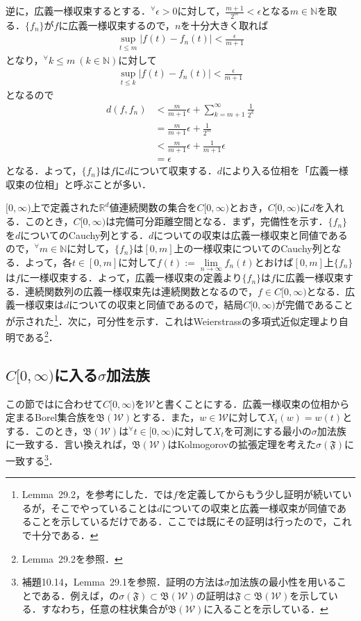 \documentclass[dvipdfmx]{jsarticle}
\begin{document}
逆に，広義一様収束するとする．$^\forall \epsilon>0$に対して，$\frac{m+1}{2^m}<\epsilon$となる$m\in\mathbb{N}$を取る．$\{f_n\}$が$f$に広義一様収束するので，$n$を十分大きく取れば
\begin{align*}
\sup_{t\leq m}|f(t)-f_n(t)|<\frac{\epsilon}{m+1}
\end{align*}
となり，$^\forall k\leq m{\ }(k\in\mathbb{N})$に対して
\begin{align*}
\sup_{t\leq k}|f(t)-f_n(t)|<\frac{\epsilon}{m+1}
\end{align*}
となるので
\begin{align*}
d(f,f_n)
&<\frac{m}{m+1}\epsilon+\sum_{k=m+1}^\infty \frac{1}{2^k} \\
&=\frac{m}{m+1}\epsilon+\frac{1}{2^m} \\
&<\frac{m}{m+1}\epsilon+\frac{1}{m+1}\epsilon \\
&=\epsilon
\end{align*}
となる．よって，$\{f_n\}$は$f$に$d$について収束する．$d$により入る位相を「広義一様収束の位相」と呼ぶことが多い．\par
$[0,\infty)$上で定義された$\mathbb{R}^d$値連続関数の集合を$C[0,\infty)$とおき，$C[0,\infty)$に$d$を入れる．このとき，$C[0,\infty)$は完備可分距離空間となる．まず，完備性を示す．$\{f_n\}$を$d$についてのCauchy列とする．$d$についての収束は広義一様収束と同値であるので，$^\forall m\in\mathbb{N}$に対して，$\{f_n\}$は$[0,m]$上の一様収束についてのCauchy列となる．よって，各$t\in [0,m]$に対して$f(t):=\underset{n\to\infty}{\lim}f_n(t)$とおけば$[0,m]$上$\{f_n\}$は$f$に一様収束する．よって，広義一様収束の定義より$\{f_n\}$は$f$に広義一様収束する．連続関数列の広義一様収束先は連続関数となるので，$f\in C[0,\infty)$となる．広義一様収束は$d$についての収束と同値であるので，結局$C[0,\infty)$が完備であることが示された\footnote{\cite{kato}Lemma{\ }29.2，\cite{kogiichiyo2}を参考にした．\cite{kogiichiyo2}では$f$を定義してからもう少し証明が続いているが，そこでやっていることは$d$についての収束と広義一様収束が同値であることを示しているだけである．ここでは既にその証明は行ったので，これで十分である．}．次に，可分性を示す．これはWeierstrassの多項式近似定理より自明である\footnote{\cite{kato}Lemma{\ }29.2を参照．}．
%
%
%
%
\subsection{$C[0,\infty)$に入る$\sigma$加法族}
この節では\cite{kotani}に合わせて$C[0,\infty)$を$\mathcal{W}$と書くことにする．広義一様収束の位相から定まるBorel集合族を$\mathfrak{B}(\mathcal{W})$とする．また，$w\in\mathcal{W}$に対して$X_t(w)=w(t)$とする．このとき，$\mathfrak{B}(\mathcal{W})$は$^\forall t\in [0,\infty)$に対して$X_t$を可測にする最小の$\sigma$加法族に一致する．言い換えれば，$\mathfrak{B}(\mathcal{W})$はKolmogorovの拡張定理を考えた$\sigma(\mathfrak{F})$に一致する\footnote{\cite{kotani}補題10.14，\cite{kato}Lemma{\ }29.1を参照．証明の方法は$\sigma$加法族の最小性を用いることである．例えば，\cite{kato}の$\sigma(\mathfrak{F})\subset \mathfrak{B}(\mathcal{W})$の証明は$\mathfrak{F}\subset \mathfrak{B}(\mathcal{W})$を示している．すなわち，任意の柱状集合が$\mathfrak{B}(\mathcal{W})$に入ることを示している．}．
%
%
%
%
\end{document}
